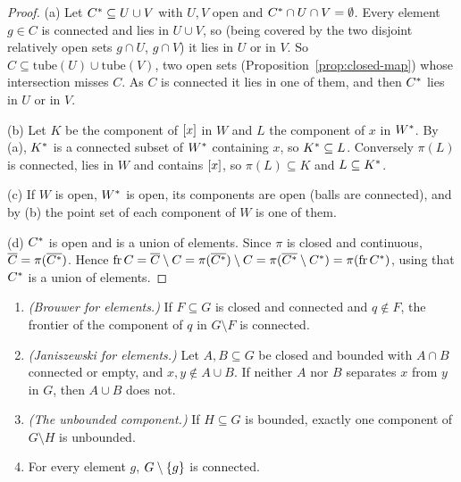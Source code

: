 \begin{proof}
(a) Let $C^{\ast}\subseteq U\cup V$ with $U,V$ open and $C^{\ast}\cap U\cap V=\emptyset$. Every element
$g\in C$ is connected and lies in $U\cup V$, so (being covered by the two disjoint relatively open
sets $g\cap U$, $g\cap V$) it lies in $U$ or in $V$. So $C\subseteq\mathrm{tube}(U)\cup\mathrm{tube}(V)$,
two open sets (Proposition~\ref{prop:closed-map}) whose intersection misses $C$. As $C$ is connected it
lies in one of them, and then $C^{\ast}$ lies in $U$ or in $V$.

(b) Let $K$ be the component of $[x]$ in $W$ and $L$ the component of $x$ in $W^{\ast}$. By (a),
$K^{\ast}$ is a connected subset of $W^{\ast}$ containing $x$, so $K^{\ast}\subseteq L$. Conversely $\pi(L)$
is connected, lies in $W$ and contains $[x]$, so $\pi(L)\subseteq K$ and $L\subseteq K^{\ast}$.

(c) If $W$ is open, $W^{\ast}$ is open, its components are open (balls are connected), and by (b) the
point set of each component of $W$ is one of them.

(d) $C^{\ast}$ is open and is a union of elements. Since $\pi$ is closed and continuous,
$\overline{C}=\pi(\overline{C^{\ast}})$. Hence $\operatorname{fr} C=\overline{C}\setminus C=\pi(\overline{C^{\ast}})\setminus C=\pi(\overline{C^{\ast}}\setminus C^{\ast})=\pi(\operatorname{fr}C^{\ast})$, using that $C^{\ast}$ is a union of elements.
\end{proof}


\begin{corollary}\label{cor:quot-tools}
\leavevmode
\begin{enumerate}[label=(\alph*)]
\item \emph{(Brouwer for elements.)} If $F\subseteq G$ is closed and connected and $q\notin F$, the
frontier of the component of $q$ in $G\setminus F$ is connected.
\item \emph{(Janiszewski for elements.)} Let $A,B\subseteq G$ be closed and bounded with $A\cap B$
connected or empty, and $x,y\notin A\cup B$. If neither $A$ nor $B$ separates $x$ from $y$ in $G$,
then $A\cup B$ does not.
\item \emph{(The unbounded component.)} If $H\subseteq G$ is bounded, exactly one component of
$G\setminus H$ is unbounded.
\item For every element $g$, $G\setminus\left\{ g \right\}$ is connected.
\end{enumerate}
\end{corollary}

